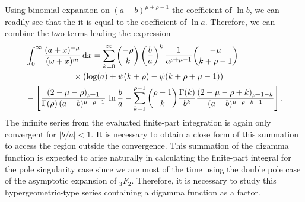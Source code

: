 Using binomial expansion on $(a-b)^{\mu+\rho-1}$ the coefficient of $\ln{b}$, we can readily see that the it is equal to the coefficient of $\ln{a}$. Therefore, we can combine the two terms leading the expression
\begin{align}
\begin{split}
    &  \int_0^\infty \frac{(a+x)^{-\mu}}{(\omega+x)^m} \, \mathrm{d}x  = \sum_{k=0}^{\infty} {-\rho \choose k} \left( \frac{b}{a} \right)^{k} \frac{1}{a^{\rho+\mu-1}}{-\mu \choose k+\rho-1} \\&  \hspace{20 mm}\times \left(\log(a)+ \psi(k+\rho) - \psi(k+\rho+\mu-1) \right) \\& - \left[ \frac{(2-\mu-\rho)_{\rho-1}}{\Gamma(\rho) \, (a-b)^{\mu+\rho-1}} \, \ln {\frac{b}{a}} - \sum_{k=1}^{\rho-1} {\rho-1 \choose k} \frac{ \Gamma(k)}{b^k} \frac{(2-\mu-\rho+k)_{\rho-1-k}}{(a-b)^{\mu+\rho-k-1}} \right].
\end{split}
\end{align}
The infinite series from the evaluated finite-part integration is again only convergent for $|b/a| < 1$. It is necessary to obtain a close form of this summation to access the region outside the convergence. This summation of the digamma function is expected to arise naturally in calculating the finite-part integral for the pole singularity case since we are most of the time using the double pole case of the asymptotic expansion of ${}_3F_2$. Therefore, it is necessary to study this hypergeometric-type series containing a digamma function as a factor.